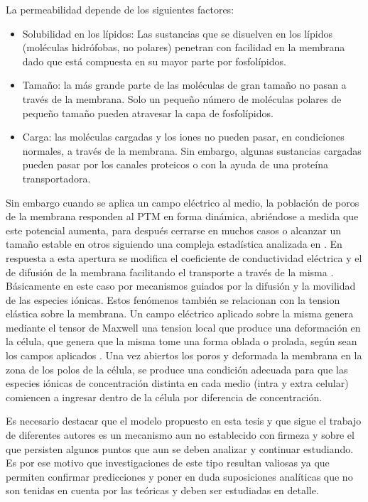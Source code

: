 La permeabilidad depende de los siguientes factores:
\begin{itemize}
    \item Solubilidad en los lípidos: Las sustancias que se disuelven en los lípidos (moléculas hidrófobas, no polares) penetran con facilidad en la membrana dado que está compuesta en su mayor parte por fosfolípidos.
    \item Tamaño: la más grande parte de las moléculas de gran tamaño no pasan a través de la membrana. Solo un pequeño número de moléculas polares de pequeño tamaño pueden atravesar la capa de fosfolípidos.
    \item Carga: las moléculas cargadas y los iones no pueden pasar, en condiciones normales, a través de la membrana. Sin embargo, algunas sustancias cargadas pueden pasar por los canales proteicos o con la ayuda de una proteína transportadora.
\end{itemize}
Sin embargo cuando se aplica un campo eléctrico al medio, la población de poros de la membrana responden al PTM en forma dinámica, abriéndose a medida que este potencial aumenta, para después cerrarse en muchos casos o alcanzar un tamaño estable en otros siguiendo una compleja estadística analizada en \cite{krass07}. En respuesta a esta apertura se modifica el coeficiente de conductividad eléctrica y el de difusión de la membrana facilitando el transporte a través de la misma \cite{c6-fodava}. Básicamente en este caso por mecanismos guiados por la difusión y la movilidad de las especies iónicas. Estos fenómenos también se relacionan con la tension elástica sobre la membrana. Un campo eléctrico aplicado sobre la misma genera mediante el tensor de Maxwell una tension local que produce una deformación en la célula, que genera que la misma tome una forma oblada o prolada, según sean los campos aplicados \cite{c13, c14}. Una vez abiertos los poros y deformada la membrana en la zona de los polos de la célula, se produce una condición adecuada para que las especies iónicas de concentración distinta en cada medio (intra y extra celular) comiencen a ingresar dentro de la célula por diferencia de concentración. 

Es necesario destacar que el modelo propuesto en esta tesis y que sigue el trabajo de diferentes autores \cite{krass07, c8} es un mecanismo aun no establecido con firmeza y sobre el que persisten algunos puntos que aun se deben analizar y continuar estudiando. Es por ese motivo que investigaciones de este tipo resultan valiosas ya que permiten confirmar predicciones y poner en duda suposiciones analíticas que no son tenidas en cuenta por las teóricas y deben ser estudiadas en detalle. 

